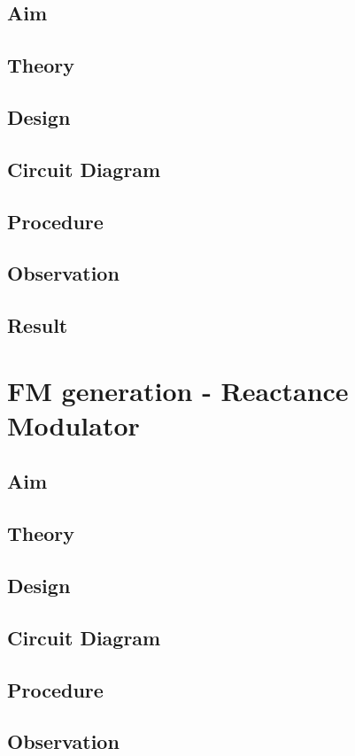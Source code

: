 \documentclass{book}
\begin{document}
\section*{Aim}
\section*{Theory}
\section*{Design}
\section*{Circuit Diagram}
\section*{Procedure}
\section*{Observation}
\section*{Result}


\chapter[FM generation - Reactance Modulator]{FM generation - Reactance Modulator}
\section*{Aim}
\section*{Theory}
\section*{Design}
\section*{Circuit Diagram}
\section*{Procedure}
\section*{Observation}
\end{document}
